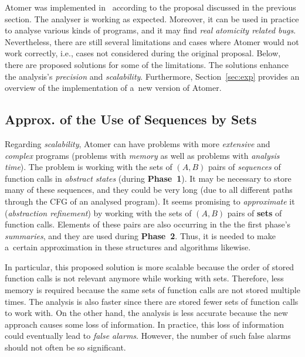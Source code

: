 \documentclass{ExcelAtFIT}
\theoremstyle{definition}
\begin{document}
Atomer was implemented in~\cite{harmimBP} according to the proposal discussed in the previous section. The analyser is working as expected. Moreover, it can be used in practice to analyse various kinds of programs, and it may find \emph{real atomicity related bugs}. Nevertheless, there are still several limitations and cases where Atomer would not work correctly, i.e., cases not considered during the original proposal. Below, there are proposed solutions for some of the limitations. The solutions enhance the analysis's \emph{precision} and \emph{scalability}. Furthermore, Section~\ref{sec:exp} provides an overview of the implementation of a~new version of Atomer.

\subsection{Approx. of the Use of Sequences by Sets}

Regarding \emph{scalability}, Atomer can have problems with more \emph{extensive} and \emph{complex} programs (problems with \emph{memory} as well as problems with \emph{analysis time}). The problem is working with the sets of ${ (A, B) }$ pairs of \emph{sequences} of function calls in \emph{abstract states} (during \textbf{Phase~1}). It may be necessary to store many of these sequences, and they could be very long (due to all different paths through the CFG of an analysed program). It seems promising to \emph{approximate} it (\emph{abstraction refinement}) by working with the sets of ${ (A, B) }$ pairs of \textbf{sets} of function calls. Elements of these pairs are also occurring in the the first phase's \emph{summaries}, and they are used during \textbf{Phase~2}. Thus, it is needed to make a~certain approximation in these structures and algorithms likewise.

In particular, this proposed solution is more scalable because the order of stored function calls is not relevant anymore while working with sets. Therefore, less memory is required because the same sets of function calls are not stored multiple times. The analysis is also faster since there are stored fewer sets of function calls to work with. On the other hand, the analysis is less accurate because the new approach causes some loss of information. In practice, this loss of information could eventually lead to \emph{false alarms}. However, the number of such false alarms should not often be so significant.
\end{document}
